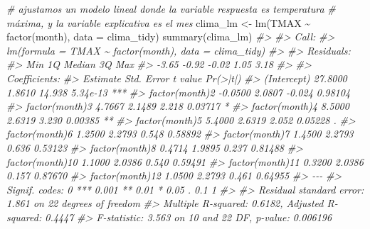 \documentclass[
]{book}
\newenvironment{Shaded}{\begin{snugshade}}{\end{snugshade}}
\newcommand{\AttributeTok}[1]{\textcolor[rgb]{0.77,0.63,0.00}{#1}}
\newcommand{\CommentTok}[1]{\textcolor[rgb]{0.56,0.35,0.01}{\textit{#1}}}
\newcommand{\FunctionTok}[1]{\textcolor[rgb]{0.00,0.00,0.00}{#1}}
\newcommand{\NormalTok}[1]{#1}
\newcommand{\OtherTok}[1]{\textcolor[rgb]{0.56,0.35,0.01}{#1}}
\newcommand{\SpecialCharTok}[1]{\textcolor[rgb]{0.00,0.00,0.00}{#1}}
\begin{document}
\begin{Shaded}
\begin{Highlighting}[]
\CommentTok{\# ajustamos un modelo lineal donde la variable respuesta es temperatura }
\CommentTok{\# máxima, y la variable explicativa es el mes}
\NormalTok{clima\_lm }\OtherTok{\textless{}{-}} \FunctionTok{lm}\NormalTok{(TMAX }\SpecialCharTok{\textasciitilde{}} \FunctionTok{factor}\NormalTok{(month), }\AttributeTok{data =}\NormalTok{ clima\_tidy)}
\FunctionTok{summary}\NormalTok{(clima\_lm)}
\CommentTok{\#\textgreater{} }
\CommentTok{\#\textgreater{} Call:}
\CommentTok{\#\textgreater{} lm(formula = TMAX \textasciitilde{} factor(month), data = clima\_tidy)}
\CommentTok{\#\textgreater{} }
\CommentTok{\#\textgreater{} Residuals:}
\CommentTok{\#\textgreater{}    Min     1Q Median     3Q    Max }
\CommentTok{\#\textgreater{}  {-}3.65  {-}0.92  {-}0.02   1.05   3.18 }
\CommentTok{\#\textgreater{} }
\CommentTok{\#\textgreater{} Coefficients:}
\CommentTok{\#\textgreater{}                 Estimate Std. Error t value Pr(\textgreater{}|t|)    }
\CommentTok{\#\textgreater{} (Intercept)      27.8000     1.8610  14.938 5.34e{-}13 ***}
\CommentTok{\#\textgreater{} factor(month)2   {-}0.0500     2.0807  {-}0.024  0.98104    }
\CommentTok{\#\textgreater{} factor(month)3    4.7667     2.1489   2.218  0.03717 *  }
\CommentTok{\#\textgreater{} factor(month)4    8.5000     2.6319   3.230  0.00385 ** }
\CommentTok{\#\textgreater{} factor(month)5    5.4000     2.6319   2.052  0.05228 .  }
\CommentTok{\#\textgreater{} factor(month)6    1.2500     2.2793   0.548  0.58892    }
\CommentTok{\#\textgreater{} factor(month)7    1.4500     2.2793   0.636  0.53123    }
\CommentTok{\#\textgreater{} factor(month)8    0.4714     1.9895   0.237  0.81488    }
\CommentTok{\#\textgreater{} factor(month)10   1.1000     2.0386   0.540  0.59491    }
\CommentTok{\#\textgreater{} factor(month)11   0.3200     2.0386   0.157  0.87670    }
\CommentTok{\#\textgreater{} factor(month)12   1.0500     2.2793   0.461  0.64955    }
\CommentTok{\#\textgreater{} {-}{-}{-}}
\CommentTok{\#\textgreater{} Signif. codes:  0 \textquotesingle{}***\textquotesingle{} 0.001 \textquotesingle{}**\textquotesingle{} 0.01 \textquotesingle{}*\textquotesingle{} 0.05 \textquotesingle{}.\textquotesingle{} 0.1 \textquotesingle{} \textquotesingle{} 1}
\CommentTok{\#\textgreater{} }
\CommentTok{\#\textgreater{} Residual standard error: 1.861 on 22 degrees of freedom}
\CommentTok{\#\textgreater{} Multiple R{-}squared:  0.6182, Adjusted R{-}squared:  0.4447 }
\CommentTok{\#\textgreater{} F{-}statistic: 3.563 on 10 and 22 DF,  p{-}value: 0.006196}
\end{Highlighting}
\end{Shaded}
\end{document}
